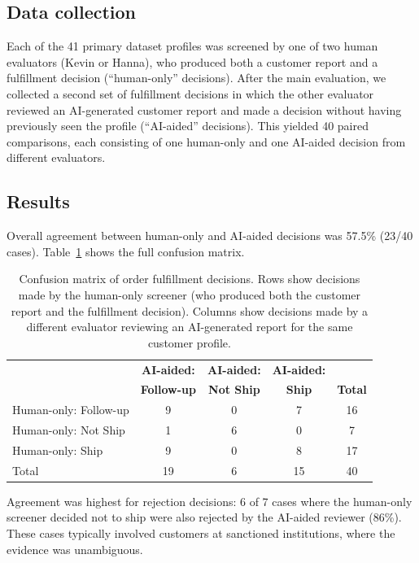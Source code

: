 \documentclass[12pt]{article}
\begin{document}
\subsection{Data collection}

Each of the 41 primary dataset profiles was screened by one of two human evaluators (Kevin or Hanna), who produced both a customer report and a fulfillment decision (``human-only'' decisions). After the main evaluation, we collected a second set of fulfillment decisions in which the other evaluator reviewed an AI-generated customer report and made a decision without having previously seen the profile (``AI-aided'' decisions). This yielded 40 paired comparisons, each consisting of one human-only and one AI-aided decision from different evaluators.

\subsection{Results}

Overall agreement between human-only and AI-aided decisions was 57.5\% (23/40 cases). Table~\ref{tab:fulfillment_matrix} shows the full confusion matrix.

\begin{table}[H]
\centering
\caption{Confusion matrix of order fulfillment decisions. Rows show decisions made by the human-only screener (who produced both the customer report and the fulfillment decision). Columns show decisions made by a different evaluator reviewing an AI-generated report for the same customer profile.}
\label{tab:fulfillment_matrix}
\begin{tabular}{lcccc}
\toprule
 & \textbf{AI-aided:} & \textbf{AI-aided:} & \textbf{AI-aided:} & \\
 & \textbf{Follow-up} & \textbf{Not Ship} & \textbf{Ship} & \textbf{Total} \\
\midrule
Human-only: Follow-up & 9 & 0 & 7 & 16 \\
Human-only: Not Ship & 1 & 6 & 0 & 7 \\
Human-only: Ship & 9 & 0 & 8 & 17 \\
\midrule
Total & 19 & 6 & 15 & 40 \\
\bottomrule
\end{tabular}
\end{table}

Agreement was highest for rejection decisions: 6 of 7 cases where the human-only screener decided not to ship were also rejected by the AI-aided reviewer (86\%). These cases typically involved customers at sanctioned institutions, where the evidence was unambiguous.
\end{document}
